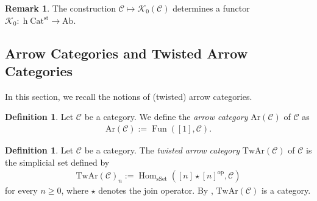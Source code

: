 \documentclass[a4paper,dvipdfmx,11pt,reqno]{amsart}
\DeclareMathOperator{\Hom}{Hom}
\DeclareMathOperator{\Map}{Map}
\DeclareMathOperator{\myop}{op}
\DeclareMathOperator{\h}{h}
\DeclareMathOperator{\Fun}{Fun}
\newcommand{\C}{\mathcal{C}}
\newcommand{\K}{\mathcal{K}}
\newcommand{\An}{\mathrm{An}}
\newcommand{\Catst}{\mathrm{Cat^{st}}}
\newcommand{\Ar}{\mathrm{Ar}}
\newcommand{\TwAr}{\mathrm{TwAr}}
\theoremstyle{definition}
\newtheorem{definition}[theorem]{Definition}
\newtheorem{remark}[theorem]{Remark}
\begin{document}
\begin{remark} \label{Ber.rem.2.5}
  The construction $\C \mapsto \K_0(\C)$ determines a functor $\K_0 : \h\Catst \to \mathrm{Ab}$.
\end{remark}

\subsection{Arrow Categories and Twisted Arrow Categories} 

In this section, we recall the notions of (twisted) arrow categories.

\begin{definition}
  Let $\C$ be a category.
  We define the \textit{arrow category} $\Ar(\C)$ of $\C$ as 
  \begin{align*}
    \Ar(\C) := \Fun([1],\C).
  \end{align*} 
\end{definition}

\begin{definition} \label{Ber.rem.3.1}
  Let $\C$ be a category.
  The \textit{twisted arrow category} $\TwAr(\C)$ of $\C$ is the simplicial set defined by 
  \begin{align*}
    \TwAr(\C)_n := \Hom_{\mathrm{sSet}}([n] \star [n]^{\myop},\C)
  \end{align*}
  for every $n \geq 0$, where $\star$ denotes the join operator.
  By \cite[Proposition 5.2.1.3]{HA}, $\TwAr(\C)$ is a category.
\end{definition}

\end{document}
